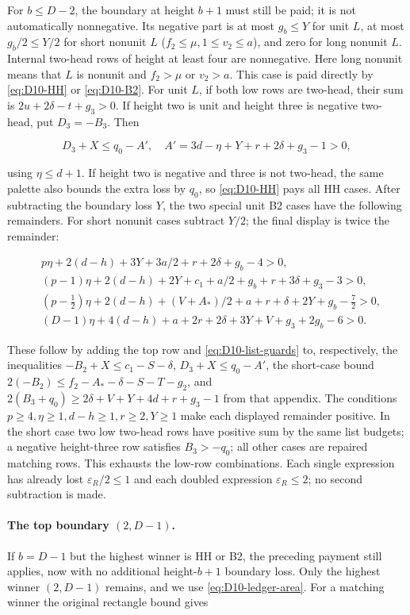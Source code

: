 \documentclass[11pt,a4paper]{article}
\theoremstyle{definition}
\begin{document}
For $b\le D-2$, the boundary at height $b+1$ must still be paid; it is not automatically nonnegative. Its negative part is at most $g_b\le Y$ for unit $L$, at most $g_b/2\le Y/2$ for short nonunit $L$ ($f_2\le\mu,1\le v_2\le a$), and zero for long nonunit $L$. Internal two-head rows of height at least four are nonnegative.
Here long nonunit means that $L$ is nonunit and $f_2>\mu$ or $v_2>a$. This case is paid directly by \eqref{eq:D10-HH} or \eqref{eq:D10-B2}. For unit $L$, if both low rows are two-head, their sum is $2u+2\delta-t+g_3>0$. If height two is unit and height three is negative two-head, put $D_3=-B_3$. Then

\[
 D_3+X\le q_0-A',\quad
 A'=3d-\eta+Y+r+2\delta+g_3-1>0,
\]

using $\eta\le d+1$. If height two is negative and three is not two-head, the same palette also bounds the extra loss by $q_0$, so \eqref{eq:D10-HH} pays all HH cases. After subtracting the boundary loss $Y$, the two special unit B2 cases have the following remainders. For short nonunit cases subtract $Y/2$; the final display is twice the remainder:

\begin{align*}
 &p\eta+2(d-h)+3Y+3a/2+r+2\delta+g_b-4>0,\\
 &(p-1)\eta+2(d-h)+2Y+c_1+a/2+g_b+r+3\delta+g_3-3>0,\\
 &(p-\tfrac12)\eta+2(d-h)+(V+A_*)/2+a+r+\delta+2Y+g_b-\tfrac72>0,\\
 &(D-1)\eta+4(d-h)+a+2r+2\delta+3Y+V+g_3+2g_b-6>0.
\end{align*}

These follow by adding the top row and \eqref{eq:D10-list-guards} to, respectively, the inequalities $-B_2+X\le c_1-S-\delta$, $D_3+X\le q_0-A'$, the short-case bound $2(-B_2)\le f_2-A_*-\delta-S-T-g_2$, and $2(B_3+q_0)\ge2\delta+V+Y+4d+r+g_3-1$ from that appendix. The conditions $p\ge4,\eta\ge1,d-h\ge1,r\ge2,Y\ge1$ make each displayed remainder positive. In the short case two low two-head rows have positive sum by the same list budgets; a negative height-three row satisfies $B_3>-q_0$; all other cases are repaired matching rows. This exhausts the low-row combinations. Each single expression has already lost $\varepsilon_R/2\le1$ and each doubled expression $\varepsilon_R\le2$; no second subtraction is made.

\paragraph{The top boundary $(2,D-1)$.}
If $b=D-1$ but the highest winner is HH or B2, the preceding payment still applies, now with no additional height-$b+1$ boundary loss. Only the highest winner $(2,D-1)$ remains, and we use \eqref{eq:D10-ledger-area}. For a matching winner the original rectangle bound gives
\end{document}

